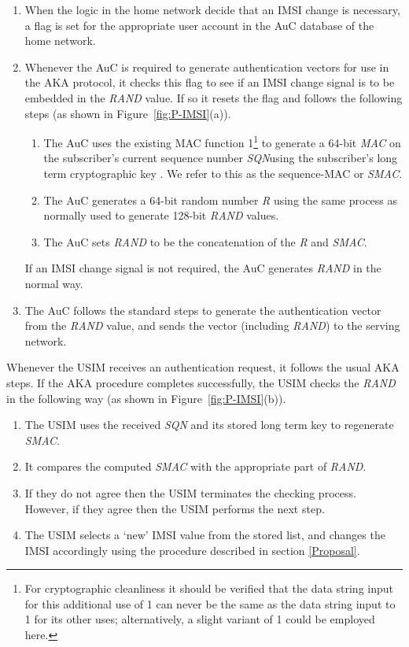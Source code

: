 \documentclass{acm_proc_article-sp}
\begin{document}
\begin{enumerate}
  
\item When the logic in the home network decide that an IMSI change is necessary, a flag is set for the appropriate user account in the AuC database of the home network. 
\item Whenever the AuC is required to generate authentication vectors for use in the AKA protocol, it checks this flag to see if an IMSI change signal is to be embedded in the \emph{RAND} value. If so it resets the flag and follows the following steps (as shown in Figure~\ref{fig:P-IMSI}(a)).

\begin{enumerate}
\item The AuC uses the existing MAC function 1\footnote{For cryptographic cleanliness it should be verified that the data string input for this additional use of 1 can never be the same as the data string input to 1 for its other uses; alternatively, a slight variant of 1 could be employed here.} to generate a 64-bit \emph{MAC} on the subscriber's current sequence number \emph{SQN}\@ using the subscriber's long term cryptographic key \@. We refer to this as the sequence-MAC or \emph{SMAC}\@. 
\item The AuC generates a 64-bit random number \emph{R} using the same process as normally used to generate 128-bit \emph{RAND} values.
\item The AuC sets \emph{RAND} to be the concatenation of the \emph{R} and \emph{SMAC}.
\end{enumerate}

If an IMSI change signal is not required, the AuC generates \emph{RAND} in the normal way.

\item The AuC follows the standard steps to generate the authentication vector from the \emph{RAND} value, and sends the vector (including \emph{RAND}) to the serving network.
\end{enumerate}


Whenever the USIM receives an authentication request, it follows the usual AKA steps. If the AKA procedure completes successfully, the USIM checks the \emph{RAND} in the following way (as shown in Figure~\ref{fig:P-IMSI}(b)). 
 
\begin{enumerate}

\item The USIM uses the received \emph{SQN} and its stored long term key  to regenerate \emph{SMAC}\@.
\item It compares the computed \emph{SMAC} with the appropriate part of \emph{RAND}\@.
\item If they do not agree then the USIM terminates the checking process. However, if they agree then the USIM performs the next step. 
\item The USIM selects a `new' IMSI value from the stored list, and changes the IMSI accordingly using the procedure described in section \ref{Proposal}.

\end{enumerate}
\end{document}
